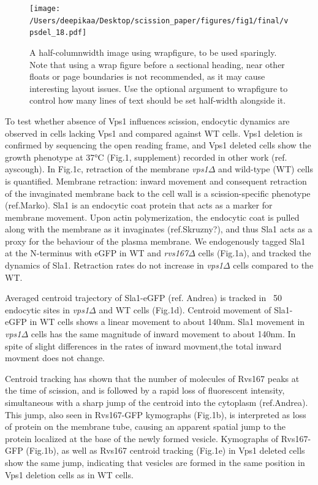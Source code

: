 \documentclass[9pt,lineno]{elife}
\begin{document}
\begin{figure}[h]
	\texttt{[image: /Users/deepikaa/Desktop/scission\_paper/figures/fig1/final/vpsdel\_18.pdf]}
	\caption{A half-columnwidth image using wrapfigure, to be used sparingly. Note that using a wrap figure before a sectional heading, near other floats or page boundaries is not recommended, as it may cause interesting layout issues. Use the optional argument to wrapfigure to control how many lines of text should be set half-width alongside it.}
	\label{fig:halfwidth}
\end{figure}

To test whether absence of Vps1 influences scission, endocytic dynamics are observed in cells lacking Vps1 and compared against WT cells. Vps1 deletion is confirmed by sequencing the open reading frame, and Vps1 deleted cells show the growth phenotype at 37\si{\degree}C (Fig.1, supplement) recorded in other work (ref. ayscough). In Fig.1c, retraction of the membrane \textit{vps1$\Delta$} and wild-type (WT) cells is quantified. Membrane retraction: inward movement and consequent retraction of the invaginated membrane back to the cell wall is a scission-specific phenotype (ref.Marko). Sla1 is an endocytic coat protein that acts as a marker for membrane movement. Upon actin polymerization, the endocytic coat is pulled along with the membrane as it invaginates (ref.Skruzny?), and thus Sla1 acts as a proxy for the behaviour of the plasma membrane. We endogenously tagged Sla1 at the N-terminus with eGFP in WT and \textit{rvs167$\Delta$} cells (Fig.1a), and tracked the dynamics of Sla1. Retraction rates do not increase in  \textit{vps1$\Delta$} cells compared to the WT. 

Averaged centroid trajectory of Sla1-eGFP (ref. Andrea) is tracked in ~50 endocytic sites in \textit{vps1$\Delta$} and WT cells (Fig.1d). Centroid movement of Sla1-eGFP in WT cells shows a linear movement to about 140nm. Sla1 movement in \textit{vps1$\Delta$} cells has the same magnitude of inward movement to about 140nm. In spite of slight differences in the rates of inward movment,the total inward movment does not change. 

Centroid tracking has shown that the number of molecules of Rvs167 peaks at the time of scission, and is followed by a rapid loss of fluorescent intensity, simultaneous with a sharp jump of the centroid into the cytoplasm (ref.Andrea). This jump, also seen in Rvs167-GFP kymographs (Fig.1b), is interpreted as loss of protein on the membrane tube, causing an apparent spatial jump to the protein localized at the base of the newly formed vesicle. Kymographs of Rvs167-GFP (Fig.1b), as well as Rvs167 centroid tracking (Fig.1e) in Vps1 deleted cells show the same jump, indicating that vesicles are formed in the same position in Vps1 deletion cells as in WT cells. 
\end{document}

